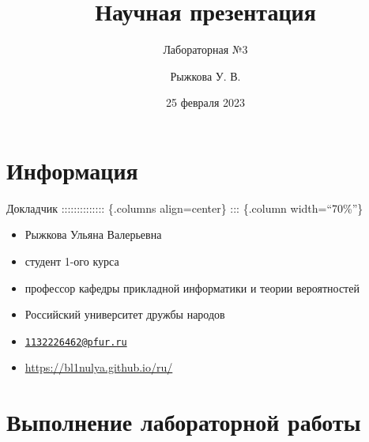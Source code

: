 \documentclass[
  ignorenonframetext,
  aspectratio=169,
]{beamer}
\title{Научная презентация}
\subtitle{Лабораторная №3}
\author{Рыжкова У. В.}
\date{25 февраля 2023}
\institute{Российский университет дружбы народов, Москва, Россия}
\providecommand{\tightlist}{%
  \setlength{\itemsep}{0pt}\setlength{\parskip}{0pt}}
\begin{document}
\frame{\titlepage}

\hypertarget{ux438ux43dux444ux43eux440ux43cux430ux446ux438ux44f}{%
\section{Информация}\label{ux438ux43dux444ux43eux440ux43cux430ux446ux438ux44f}}

\begin{frame}{Докладчик}
\protect\hypertarget{ux434ux43eux43aux43bux430ux434ux447ux438ux43a}{}
:::::::::::::: \{.columns align=center\} ::: \{.column width=``70\%''\}

\begin{itemize}
\tightlist
\item
  Рыжкова Ульяна Валерьевна
\item
  студент 1-ого курса
\item
  профессор кафедры прикладной информатики и теории вероятностей
\item
  Российский университет дружбы народов
\item
  \href{mailto:1132226462@pfur.ru}{\nolinkurl{1132226462@pfur.ru}}
\item
  \url{https://bl1nulya.github.io/ru/}
\end{itemize}
\end{frame}

\hypertarget{ux432ux44bux43fux43eux43bux43dux435ux43dux438ux435-ux43bux430ux431ux43eux440ux430ux442ux43eux440ux43dux43eux439-ux440ux430ux431ux43eux442ux44b}{%
\section{Выполнение лабораторной
работы}\label{ux432ux44bux43fux43eux43bux43dux435ux43dux438ux435-ux43bux430ux431ux43eux440ux430ux442ux43eux440ux43dux43eux439-ux440ux430ux431ux43eux442ux44b}}
\end{document}
